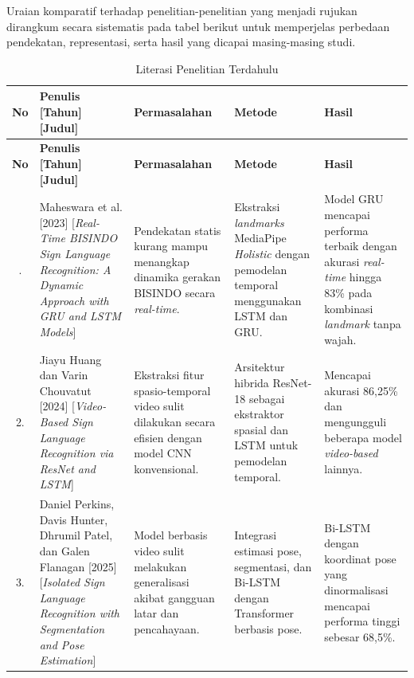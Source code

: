 Uraian komparatif terhadap penelitian-penelitian yang menjadi rujukan dirangkum secara sistematis pada tabel berikut untuk memperjelas perbedaan pendekatan, representasi, serta hasil yang dicapai masing-masing studi.
\renewcommand{\arraystretch}{1.0} %
\begin{longtable}{|c|p{}|p{}|p{}|p{}|}
  \caption{Literasi Penelitian Terdahulu}\label{table:2.literasi}\\
  \hline
   \textbf{No} 
     & \textbf{Penulis [Tahun] [Judul]} 
     & \textbf{Permasalahan} 
     & \textbf{Metode} 
     & \textbf{Hasil} \\
  \hline
\endfirsthead
  \hline
   \textbf{No} 
     & \textbf{Penulis [Tahun] [Judul]} 
     & \textbf{Permasalahan} 
     & \textbf{Metode} 
     & \textbf{Hasil} \\
   \hline
 \endhead
   \hline
 \endfoot
   \hline
 \endlastfoot
     1. 
     & Maheswara et al. [2023] [\textit{Real-Time BISINDO Sign Language Recognition: A Dynamic Approach with GRU and LSTM Models}] \cite{maheswara2023lstmbisindo}
     & Pendekatan statis kurang mampu menangkap dinamika gerakan BISINDO secara \textit{real-time}.
     & Ekstraksi \textit{landmarks} MediaPipe \textit{Holistic} dengan pemodelan temporal menggunakan LSTM dan GRU.
     & Model GRU mencapai performa terbaik dengan akurasi \textit{real-time} hingga 83\% pada kombinasi \textit{landmark} tanpa wajah. \\
     \hline
     2.
     & Jiayu Huang dan Varin Chouvatut [2024] [\textit{Video-Based Sign Language Recognition via ResNet and LSTM}] \cite{huang2024videoresnetlstm}
     & Ekstraksi fitur spasio-temporal video sulit dilakukan secara efisien dengan model CNN konvensional.
     & Arsitektur hibrida ResNet-18 sebagai ekstraktor spasial dan LSTM untuk pemodelan temporal.
     & Mencapai akurasi 86,25\% dan mengungguli beberapa model \textit{video-based} lainnya. \\
     \hline
     3.
     & Daniel Perkins, Davis Hunter, Dhrumil Patel, dan Galen Flanagan [2025] [\textit{Isolated Sign Language Recognition with Segmentation and Pose Estimation}] \cite{perkins2025islr}
     & Model berbasis video sulit melakukan generalisasi akibat gangguan latar dan pencahayaan.
     & Integrasi estimasi pose, segmentasi, dan Bi-LSTM dengan Transformer berbasis pose.
     & Bi-LSTM dengan koordinat pose yang dinormalisasi mencapai performa tinggi sebesar 68,5\%.\\

\end{longtable}

